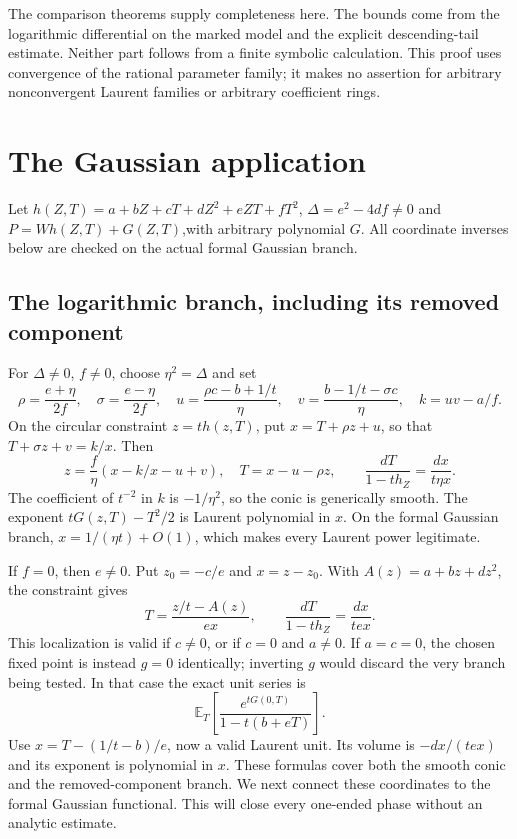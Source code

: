 \documentclass[11pt]{article}
\theoremstyle{definition}\newtheorem{definition}[theorem]{Definition}
\theoremstyle{remark}\newtheorem{remark}[theorem]{Remark}
\newcommand{\E}{\mathbb E}
\begin{document}
The comparison theorems supply completeness here. The bounds come
from the logarithmic differential on the marked model and the explicit
descending-tail estimate. Neither part follows from a finite symbolic
calculation. This proof uses convergence of the rational parameter
family; it makes no assertion for arbitrary nonconvergent Laurent
families or arbitrary coefficient rings.

\section{The Gaussian application}
Let $h(Z,T)=a+bZ+cT+dZ^2+eZT+fT^2$,
$\Delta=e^2-4df\ne0$ and $P=Wh(Z,T)+G(Z,T)$,with arbitrary
polynomial $G$. All coordinate inverses below are checked on the
actual formal Gaussian branch.
\subsection{The logarithmic branch, including its removed component}

For $\Delta\ne0$, $f\ne0$, choose $\eta^2=\Delta$ and set
\[
 \rho=\frac{e+\eta}{2f},\quad \sigma=\frac{e-\eta}{2f},\quad
 u=\frac{\rho c-b+1/t}{\eta},\quad
 v=\frac{b-1/t-\sigma c}{\eta},\quad k=uv-a/f.
\]
On the circular constraint $z=th(z,T)$, put
$x=T+\rho z+u$, so that $T+\sigma z+v=k/x$. Then
\[
 z=\frac f\eta(x-k/x-u+v),\quad T=x-u-\rho z,
 \qquad
 \frac{dT}{1-th_Z}=\frac{dx}{t\eta x}.
\]
The coefficient of $t^{-2}$ in $k$ is $-1/\eta^2$, so the conic
is generically smooth. The exponent $tG(z,T)-T^2/2$ is Laurent
polynomial in $x$. On the formal Gaussian branch,
$x=1/(\eta t)+O(1)$, which makes every Laurent power legitimate.

If $f=0$, then $e\ne0$. Put $z_0=-c/e$ and $x=z-z_0$. With
$A(z)=a+bz+dz^2$, the constraint gives
\[
 T=\frac{z/t-A(z)}{ex},\qquad
 \frac{dT}{1-th_Z}=\frac{dx}{tex}.
\]
This localization is valid if $c\ne0$, or if $c=0$ and $a\ne0$.
If $a=c=0$, the chosen fixed point is instead $g=0$ identically;
inverting $g$ would discard the very branch being tested. In that
case the exact unit series is
\[
 \E_T\left[\frac{e^{tG(0,T)}}{1-t(b+eT)}\right].
\]
Use $x=T-(1/t-b)/e$, now a valid Laurent unit. Its volume is
$-dx/(tex)$ and its exponent is polynomial in $x$. These formulas
cover both the smooth conic and the removed-component branch.
We next connect these coordinates to the formal Gaussian functional.
This will close every one-ended phase without an analytic estimate.
\end{document}
